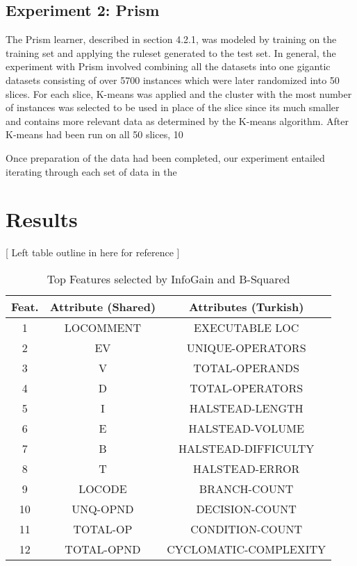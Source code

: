 \documentclass{sig-alternate}
\begin{document}
\subsection{Experiment 2: Prism}
The Prism learner, described in section 4.2.1, was modeled by training on the training set and applying the ruleset generated to the test set. In general, the experiment with Prism involved combining all the datasets into one gigantic datasets consisting of over 5700 instances which were later randomized into 50 slices. For each slice, K-means was applied and the cluster with the most number of instances was selected to be used in place of the slice since its much smaller and contains more relevant data as determined by the K-means algorithm. After K-means had been run on all 50 slices, 10%

Once preparation of the data had been completed, our experiment entailed iterating through each set of data in the

\section{Results}
[ Left table outline in here for reference ]

\begin{table}[h]
\centering
\caption{Top Features selected by InfoGain and B-Squared}
\begin{tabular}{|c|c|c|} \hline
Feat.&Attribute (Shared)&Attributes (Turkish)\\\hline
1& LOCOMMENT & EXECUTABLE LOC\\ \hline
2& EV & UNIQUE-OPERATORS\\ \hline
3& V & TOTAL-OPERANDS\\ \hline
4& D & TOTAL-OPERATORS\\ \hline
5& I & HALSTEAD-LENGTH\\ \hline
6& E & HALSTEAD-VOLUME\\ \hline
7& B & HALSTEAD-DIFFICULTY\\ \hline
8& T & HALSTEAD-ERROR\\ \hline
9& LOCODE & BRANCH-COUNT\\ \hline
10& UNQ-OPND & DECISION-COUNT\\ \hline
11& TOTAL-OP & CONDITION-COUNT\\ \hline
12& TOTAL-OPND & CYCLOMATIC-COMPLEXITY\\ \hline

\hline\end{tabular}
\end{table}
\end{document}
